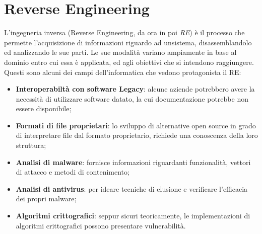 \documentclass[12pt,oneside]{fithesis2}
\newcommand{\chapquote}[3]{\begin{quotation} \textit{#1} \end{quotation} \begin{flushright} - #2, \textit{#3}\end{flushright} }
\begin{document}
        
        
        
    
        \section*{Reverse Engineering}
        L'ingegneria inversa (Reverse Engineering, da ora in poi \emph{RE}) è il processo che permette l'acquisizione di informazioni riguardo ad un\newline sistema, disassemblandolo ed analizzando le sue parti.
        Le sue modalità variano ampiamente in base al dominio entro cui 
        essa è applicata, ed agli obiettivi che si intendono raggiungere. Questi sono alcuni dei
        campi dell'informatica che vedono protagonista il RE:
        \setlength{}  
        \begin{itemize}
          \item \textbf{Interoperabiltà con software Legacy}: alcune aziende potrebbero avere la necessità di utilizzare software datato, la cui documentazione potrebbe non essere disponibile;
          \item \textbf{Formati di file proprietari}: lo sviluppo di alternative open source in grado di interpretare file dal formato proprietario, richiede una conoscenza della loro struttura;
          \item \textbf{Analisi di malware}: fornisce informazioni riguardanti funzionalità, vettori di attacco e metodi di contenimento;
          \item \textbf{Analisi di antivirus}: per ideare tecniche di elusione e verificare l'efficacia dei propri malware;
          \item \textbf{Algoritmi crittografici}: seppur sicuri teoricamente, le implementazioni di algoritmi crittografici possono presentare vulnerabilità.
        \end{itemize}
\end{document}
